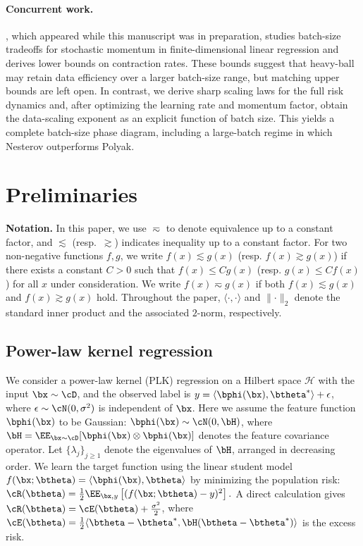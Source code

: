 \documentclass[11pt]{article}
\begin{document}
\paragraph{Concurrent work.}
\citet{morwani2026compute}, which appeared while this manuscript was in preparation, studies batch-size tradeoffs for stochastic momentum in finite-dimensional linear regression and derives lower bounds on contraction rates. These bounds suggest that heavy-ball may retain data efficiency over a larger batch-size range, but matching upper bounds are left open. In contrast, we derive sharp scaling laws for the full risk dynamics and, after optimizing the learning rate and momentum factor, obtain the data-scaling exponent as an explicit function of batch size. This yields a complete batch-size phase diagram, including a large-batch regime in which Nesterov outperforms Polyak.

\section{Preliminaries}
\label{sec:preliminaries}
\vspace{-.3em}
{\bf Notation.} In this paper, we use $\eqsim$ to denote equivalence up to a constant factor, and $\lesssim$ (resp.~$\gtrsim$) indicates inequality up to a constant factor. For two non-negative functions $f,g$, we write $f(x)\lesssim g(x)$ (resp. $f(x)\gtrsim g(x)$) if there exists a constant $C>0$ such that $f(x)\leq C g(x)$ (resp. $g(x)\leq C f(x)$) for all $x$ under consideration. We write $f(x)\eqsim g(x)$ if both $f(x)\lesssim g(x)$ and $f(x)\gtrsim g(x)$ hold. 
Throughout the paper, \(\langle\cdot,\cdot\rangle\) and
\(\lVert\cdot\lVert_2\) denote the standard inner product and the associated \(2\)-norm, respectively.


\subsection{Power-law kernel regression}
\label{sec:plkr}
We consider a power-law kernel (PLK) regression  on a Hilbert space \(\mathcal H\) with the input \(\bx\sim\cD\), and the observed label is \(y=\langle\bphi(\bx), \btheta^*\rangle + \epsilon\), where \(\epsilon \sim \cN(0,\sigma^2)\) is independent of \(\bx\). Here we assume the feature function $\bphi(\bx)$ to be Gaussian: $\bphi(\bx) \sim \cN(0,\bH)$, where $\bH = \EE_{\bx\sim \cD}[\bphi(\bx) \otimes\bphi(\bx)]$ denotes the feature covariance operator. Let \(\{\lambda_j\}_{j\geq1}\) denote the eigenvalues of \(\bH\), arranged in decreasing order.
We learn the target function using the linear student model $f(\bx;\btheta) = \langle\bphi(\bx), \btheta\rangle$ by minimizing the population risk:
$\cR(\btheta) = \frac{1}{2} \EE_{\bx,y}\left[(f(\bx;\btheta)-y)^2\right].$
A direct calculation gives $\cR(\btheta) = \cE(\btheta) + \frac{\sigma^2}{2}$, where $\cE(\btheta) = \frac{1}{2}\langle\btheta-\btheta^*,\bH (\btheta-\btheta^*)\rangle$ is the  excess risk.
\end{document}
